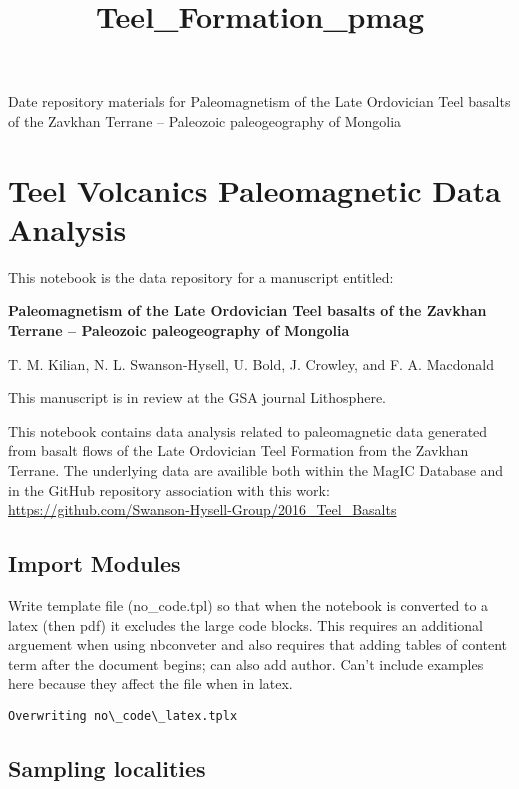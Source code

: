 \documentclass[11pt]{article}
\title{Teel\_Formation\_pmag}
\begin{document}
    
{\Large Date repository materials for Paleomagnetism of the Late Ordovician Teel basalts of the
Zavkhan Terrane -- Paleozoic paleogeography of Mongolia}
    
\tableofcontents

    \section{Teel Volcanics Paleomagnetic Data
Analysis}\label{teel-volcanics-data-analysis}

    This notebook is the data repository for a manuscript entitled:

\textbf{Paleomagnetism of the Late Ordovician Teel basalts of the
Zavkhan Terrane -- Paleozoic paleogeography of Mongolia}

T. M. Kilian, N. L. Swanson-Hysell, U. Bold, J. Crowley, and F. A.
Macdonald

This manuscript is in review at the GSA journal Lithosphere.

This notebook contains data analysis related to paleomagnetic data
generated from basalt flows of the Late Ordovician Teel Formation from
the Zavkhan Terrane. The underlying data are availible both within the
MagIC Database and in the GitHub repository association with this work: \url{https://github.com/Swanson-Hysell-Group/2016\_Teel\_Basalts}

    \subsection{Import Modules}\label{import-modules}



    Write template file (no\_code.tpl) so that when the notebook is
converted to a latex (then pdf) it excludes the large code blocks. This
requires an additional arguement when using nbconveter and also requires
that adding tables of content term after the document begins; can also
add author. Can't include examples here because they affect the file
when in latex.


    \begin{Verbatim}[commandchars=\\\{\}]
Overwriting no\_code\_latex.tplx
    \end{Verbatim}

    \subsection{Sampling localities}\label{sampling-localities}
\end{document}
